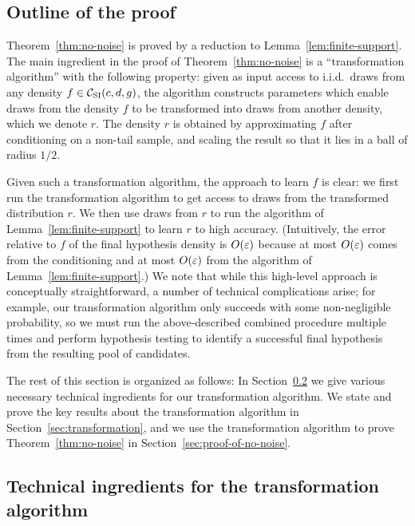 \subsection{Outline of the proof}
Theorem~\ref{thm:no-noise} is proved by a reduction to Lemma~\ref{lem:finite-support}. The main ingredient in the proof of Theorem~\ref{thm:no-noise} is a ``transformation algorithm'' with the following property:  given as input access to i.i.d.\ draws from any density $f  \in{\mathcal C}_{\mathrm{SI}}(c,d,g)$, the algorithm constructs parameters which enable draws from the density $f$ to be transformed into draws from another density, which we denote $r$.  The density $r$ is obtained by
approximating $f$ after conditioning on a non-tail sample, and scaling the result so that it lies in
a ball of radius $1/2$.

Given such a transformation algorithm, the approach to learn $f$ is
clear: we first run the transformation algorithm to get access to
draws from the transformed distribution $r$.  We then use draws from
$r$ to run the algorithm of Lemma~\ref{lem:finite-support} to learn
$r$ to high accuracy.  (Intuitively, the
error relative to $f$ of the final hypothesis density is $O(\varepsilon)$
because at most $O(\varepsilon)$ comes from the conditioning and at most
$O(\varepsilon)$ from the algorithm of Lemma~\ref{lem:finite-support}.) We
note that while this high-level approach is conceptually
straightforward, a number of technical complications arise; for
example, our transformation algorithm only succeeds with some
non-negligible probability, so we must run the above-described
combined procedure multiple times and perform hypothesis testing to
identify a successful final hypothesis from the resulting pool of
candidates.

The rest of this section is organized as follows: In
Section~\ref{sec:setup} we give various necessary technical
ingredients for our transformation algorithm.  We state and prove the
key results about the transformation algorithm in
Section~\ref{sec:transformation}, and we use the transformation
algorithm to prove Theorem~\ref{thm:no-noise} in
Section~\ref{sec:proof-of-no-noise}.


\subsection{Technical ingredients for the transformation algorithm} \label{sec:setup}



